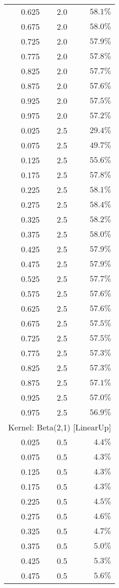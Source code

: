 \begin{longtable}{rrr}
0.625 & 2.0 & $58.1\%$ \\ 
0.675 & 2.0 & $58.0\%$ \\ 
0.725 & 2.0 & $57.9\%$ \\ 
0.775 & 2.0 & $57.8\%$ \\ 
0.825 & 2.0 & $57.7\%$ \\ 
0.875 & 2.0 & $57.6\%$ \\ 
0.925 & 2.0 & $57.5\%$ \\ 
0.975 & 2.0 & $57.2\%$ \\ 
0.025 & 2.5 & $29.4\%$ \\ 
0.075 & 2.5 & $49.7\%$ \\ 
0.125 & 2.5 & $55.6\%$ \\ 
0.175 & 2.5 & $57.8\%$ \\ 
0.225 & 2.5 & $58.1\%$ \\ 
0.275 & 2.5 & $58.4\%$ \\ 
0.325 & 2.5 & $58.2\%$ \\ 
0.375 & 2.5 & $58.0\%$ \\ 
0.425 & 2.5 & $57.9\%$ \\ 
0.475 & 2.5 & $57.9\%$ \\ 
0.525 & 2.5 & $57.7\%$ \\ 
0.575 & 2.5 & $57.6\%$ \\ 
0.625 & 2.5 & $57.6\%$ \\ 
0.675 & 2.5 & $57.5\%$ \\ 
0.725 & 2.5 & $57.5\%$ \\ 
0.775 & 2.5 & $57.3\%$ \\ 
0.825 & 2.5 & $57.3\%$ \\ 
0.875 & 2.5 & $57.1\%$ \\ 
0.925 & 2.5 & $57.0\%$ \\ 
0.975 & 2.5 & $56.9\%$ \\ 
\midrule
\multicolumn{3}{l}{Kernel: Beta(2,1) [LinearUp]} \\ 
\midrule
0.025 & 0.5 & $4.4\%$ \\ 
0.075 & 0.5 & $4.3\%$ \\ 
0.125 & 0.5 & $4.3\%$ \\ 
0.175 & 0.5 & $4.3\%$ \\ 
0.225 & 0.5 & $4.5\%$ \\ 
0.275 & 0.5 & $4.6\%$ \\ 
0.325 & 0.5 & $4.7\%$ \\ 
0.375 & 0.5 & $5.0\%$ \\ 
0.425 & 0.5 & $5.3\%$ \\ 
0.475 & 0.5 & $5.6\%$ \\ 

\end{longtable}
